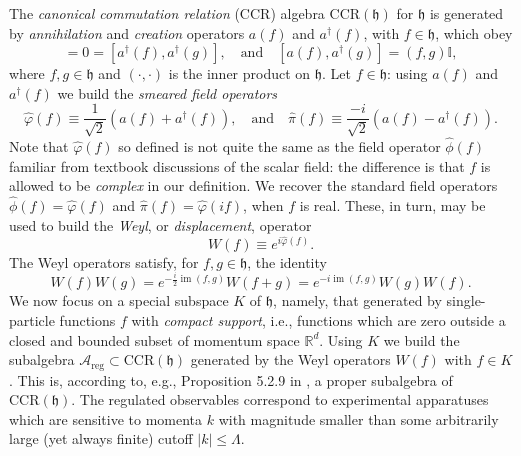 \documentclass[11pt]{amsart}
\DeclareMathOperator{\im}{im}
\theoremstyle{plain}%
\theoremstyle{definition}
\theoremstyle{remark}
\begin{document}
The \emph{canonical commutation relation} (CCR) algebra $\text{CCR}(\mathfrak{h})$ for $\mathfrak{h}$ is generated by \emph{annihilation} and \emph{creation} operators $a(f)$ and $a^\dag(f)$, with $f\in\mathfrak{h}$, which obey
\begin{equation}
	[a(f), a(g)] = 0 = [a^\dag(f), a^\dag(g)], \quad \text{and}\quad [a(f), a^\dag(g)] = (f,g)\mathbb{I},
\end{equation}
where $f, g\in \mathfrak{h}$ and $(\cdot, \cdot)$ is the inner product on $\mathfrak{h}$. Let $f\in \mathfrak{h}$: using $a(f)$ and $a^\dag(f)$ we build the \emph{smeared field operators}
\begin{equation}
	\widehat{\varphi}(f) \equiv \frac{1}{\sqrt2}(a(f) + a^\dag(f)), \quad \text{and} \quad \widehat{\pi}(f) \equiv \frac{-i}{\sqrt2}(a(f) - a^\dag(f)).
\end{equation}
Note that $\widehat{\varphi}(f)$ so defined is not quite the same as the field operator $\widehat{\phi}(f)$ familiar from textbook discussions of the scalar field: the difference is that $f$ is allowed to be \emph{complex} in our definition. We recover the standard field operators $\widehat{\phi}(f) = \widehat{\varphi}(f)$ and $\widehat{\pi}(f) = \widehat{\varphi}(if)$, when $f$ is real. These, in turn, may be used to build the \emph{Weyl}, or \emph{displacement}, operator
\begin{equation}
	W(f) \equiv e^{i\widehat{\varphi}(f)}.
\end{equation}
The Weyl operators satisfy, for $f, g \in \mathfrak{h}$, the identity
\begin{equation}
	W(f)W(g) = e^{-\frac{i}{2}\im(f,g)}W(f+g) = e^{-{i}\im(f,g)}W(g)W(f).
\end{equation}
We now focus on a special subspace $K$ of $\mathfrak{h}$, namely, that generated by single-particle functions $f$ with \emph{compact support}, i.e., functions which are zero outside a closed and bounded subset of momentum space $\mathbb{R}^d$. Using $K$ we build the subalgebra $\mathcal{A}_{\text{reg}}\subset \text{CCR}(\mathfrak{h})$ generated by the Weyl operators $W(f)$ with $f\in K$. This is, according to, e.g., Proposition 5.2.9 in \cite{bratteli_operator_1997}, a proper subalgebra of $\text{CCR}(\mathfrak{h})$. The regulated observables correspond to experimental apparatuses which are sensitive to momenta $k$ with magnitude smaller than some arbitrarily large (yet always finite) cutoff $|k| \le \Lambda$.
\end{document}
